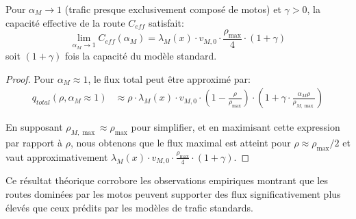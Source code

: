 \begin{theorem}
Pour $\alpha_M \to 1$ (trafic presque exclusivement composé de motos) et $\gamma > 0$, la capacité effective de la route $C_{eff}$ satisfait:
\begin{equation}
\lim_{\alpha_M \to 1} C_{eff}(\alpha_M) = \lambda_M(x) \cdot v_{M,0} \cdot \frac{\rho_{\max}}{4} \cdot (1 + \gamma)
\end{equation}
soit $(1 + \gamma)$ fois la capacité du modèle standard.
\end{theorem}

\begin{proof}
Pour $\alpha_M \approx 1$, le flux total peut être approximé par:
\begin{align}
q_{total}(\rho, \alpha_M \approx 1) &\approx \rho \cdot \lambda_M(x) \cdot v_{M,0} \cdot \left(1 - \frac{\rho}{\rho_{\max}}\right) \cdot \left(1 + \gamma \cdot \frac{\alpha_M \rho}{\rho_{M,\max}}\right)
\end{align}

En supposant $\rho_{M,\max} \approx \rho_{\max}$ pour simplifier, et en maximisant cette expression par rapport à $\rho$, nous obtenons que le flux maximal est atteint pour $\rho \approx \rho_{\max}/2$ et vaut approximativement $\lambda_M(x) \cdot v_{M,0} \cdot \frac{\rho_{\max}}{4} \cdot (1 + \gamma)$.
\end{proof}

Ce résultat théorique corrobore les observations empiriques montrant que les routes dominées par les motos peuvent supporter des flux significativement plus élevés que ceux prédits par les modèles de trafic standards.

